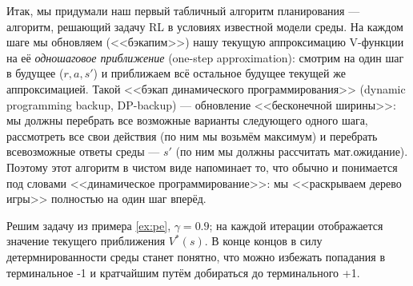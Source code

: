 Итак, мы придумали наш первый табличный алгоритм планирования --- алгоритм, решающий задачу RL в условиях известной модели среды. На каждом шаге мы обновляем (<<бэкапим>>) нашу текущую аппроксимацию V-функции на её \emph{одношаговое приближение} (one-step approximation): смотрим на один шаг в будущее ($r, a, s'$) и приближаем всё остальное будущее текущей же аппроксимацией. Такой <<бэкап динамического программирования>> (dynamic programming backup, DP-backup) --- обновление <<бесконечной ширины>>: мы должны перебрать все возможные варианты следующего одного шага, рассмотреть все свои действия (по ним мы возьмём максимум) и перебрать всевозможные ответы среды --- $s'$ (по ним мы должны рассчитать мат.ожидание). Поэтому этот алгоритм в чистом виде напоминает то, что обычно и понимается под словами <<динамическое программирование>>: мы <<раскрываем дерево игры>> полностью на один шаг вперёд.

\begin{exampleBox}[righthand ratio=0.3, sidebyside, sidebyside align=center, lower separated=false]{}
Решим задачу из примера \ref{ex:pe}, $\gamma = 0.9$; на каждой итерации отображается значение текущего приближения $V^{*}(s)$. В конце концов в силу детермнированности среды станет понятно, что можно избежать попадания в терминальное -1 и кратчайшим путём добираться до терминального +1.

\tcblower
\end{exampleBox}



